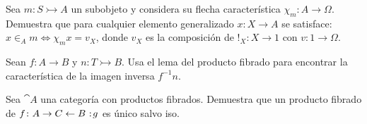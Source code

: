 \begin{exercise}[teca=1]
  Sea \(m\colon S\rightarrowtail A\) un subobjeto y considera su flecha
  característica \(\chi_m\colon A\to \Omega\). Demuestra que para
  cualquier elemento generalizado \(x\colon X\to A\) se satisface: \( x\in_A m \iff \chi_m x = v_X \), donde \(v_X\) es la composición de \(!_X\colon X\to 1\) con \(v\colon 1\to \Omega\).
\end{exercise}

\begin{exercise}
  Sean \(f\colon A\to B\) y \(n\colon T\rightarrowtail B\). Usa el lema
  del producto fibrado para encontrar la característica de la imagen
  inversa \(f^{-1}n\).
\end{exercise}


\begin{exercise}[par=2]
  Sea \(\cat{A}\) una categoría con productos fibrados. Demuestra que un
  producto fibrado de \(f\colon A\to C\leftarrow B\noloc g\) es
  único salvo iso.
\end{exercise}

